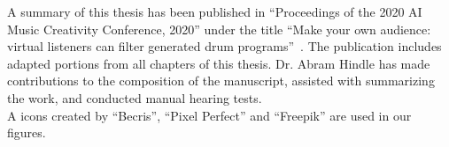 \documentclass[\main/thesis.tex]{subfiles}
\begin{document}
\begin{preface}
A summary of this thesis has been published in \enquote{Proceedings of the 2020 AI Music Creativity Conference, 2020} under the title \enquote{Make your own audience: virtual listeners can filter generated drum programs}~\cite{salimiCSMC2020-virtual-listeners-drums}. The publication includes adapted portions from all chapters of this thesis.  Dr. Abram Hindle has made contributions to the composition of the manuscript, assisted with summarizing the work, and conducted manual hearing tests.\\

A icons created by \enquote{Becris}, \enquote{Pixel Perfect} and \enquote{Freepik} are used in our figures.\\\\ 




\end{preface}
\end{document}
